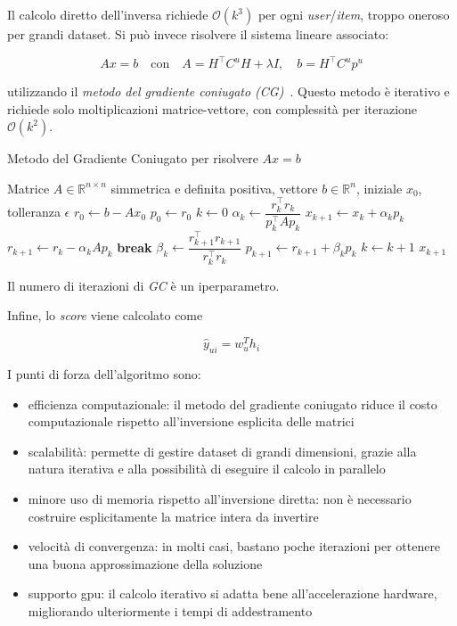Il calcolo diretto dell'inversa richiede $\mathcal{O}(k^3)$ per ogni \textit{user}/\textit{item}, troppo oneroso per grandi dataset. Si può invece risolvere il sistema lineare associato:

\[
A x = b \quad \text{con} \quad A = H^\top C^u H + \lambda I, \quad b = H^\top C^u p^u
\]

utilizzando il \textit{metodo del gradiente coniugato (CG)}~\cite{ALS_opt}. Questo metodo è iterativo e richiede solo moltiplicazioni matrice-vettore, con complessità per iterazione $\mathcal{O}(k^2)$.

\begin{algorithm}[H]
    \caption{Metodo del Gradiente Coniugato per risolvere $Ax = b$}
    \begin{algorithmic}[1]
    \Require Matrice $A \in \mathbb{R}^{n \times n}$ simmetrica e definita positiva, vettore $b \in \mathbb{R}^n$, iniziale $x_0$, tolleranza $\epsilon$
    \State $r_0 \gets b - A x_0$
    \State $p_0 \gets r_0$
    \State $k \gets 0$
        \State $\alpha_k \gets \dfrac{r_k^\top r_k}{p_k^\top A p_k}$
        \State $x_{k+1} \gets x_k + \alpha_k p_k$
        \State $r_{k+1} \gets r_k - \alpha_k A p_k$
            \State \textbf{break}
        \EndIf
        \State $\beta_k \gets \dfrac{r_{k+1}^\top r_{k+1}}{r_k^\top r_k}$
        \State $p_{k+1} \gets r_{k+1} + \beta_k p_k$
        \State $k \gets k + 1$
    \EndWhile
    \State \Return $x_{k+1}$
    \end{algorithmic}
\end{algorithm}
    
Il numero di iterazioni di \textit{GC} è un iperparametro.

Infine, lo \textit{score} viene calcolato come

\[
\hat{y}_{ui} = w_u^T h_i
\]

I punti di forza dell'algoritmo sono:
\begin{itemize}
    \item efficienza computazionale: il metodo del gradiente coniugato riduce il costo computazionale rispetto all'inversione esplicita delle matrici
    \item scalabilità: permette di gestire dataset di grandi dimensioni, grazie alla natura iterativa e alla possibilità di eseguire il calcolo in parallelo
    \item minore uso di memoria rispetto all'inversione diretta: non è necessario costruire esplicitamente la matrice intera da invertire
    \item velocità di convergenza: in molti casi, bastano poche iterazioni per ottenere una buona approssimazione della soluzione
    \item supporto gpu: il calcolo iterativo si adatta bene all'accelerazione hardware, migliorando ulteriormente i tempi di addestramento
\end{itemize}

